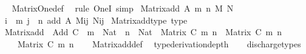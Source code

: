 \begin{isabellebody}
%
\isadelimproof
\ \ %
\endisadelimproof
%
\isatagproof
{}\isamarkupfalse%
\ Matrix{\isacharunderscore}{\kern0pt}One{\isacharunderscore}{\kern0pt}def\ \isamarkupfalse%
\ {\isacharparenleft}{\kern0pt}rule\ OneI{\isacharparenright}{\kern0pt}\ simp%
\endisatagproof
{\isafoldproof}%
%
\isadelimproof
%
\endisadelimproof
%
\isadelimdocument
%
\endisadelimdocument
%
\isatagdocument
%
\isamarkuptrue%
%
\endisatagdocument
{\isafolddocument}%
%
\isadelimdocument
%
\endisadelimdocument
{}\isamarkupfalse%
\ {\isachardoublequoteopen}Matrix{\isacharunderscore}{\kern0pt}add\ A\ m\ n\ M\ N\ {\isasymequiv}\isanewline
\ \ {\isasymlambda}i\ {\isasymin}\ {\isacharbrackleft}{\kern0pt}{}{\isacharcomma}{\kern0pt}{\isasymdots}{\isacharcomma}{\kern0pt}m{\isacharbrackleft}{\kern0pt}{\isachardot}{\kern0pt}\ {\isasymlambda}j\ {\isasymin}\ {\isacharbrackleft}{\kern0pt}{}{\isacharcomma}{\kern0pt}{\isasymdots}{\isacharcomma}{\kern0pt}n{\isacharbrackleft}{\kern0pt}{\isachardot}{\kern0pt}\ add\ A\ {\isacharparenleft}{\kern0pt}M{\isacharbackquote}{\kern0pt}i{\isacharbackquote}{\kern0pt}j{\isacharparenright}{\kern0pt}\ {\isacharparenleft}{\kern0pt}N{\isacharbackquote}{\kern0pt}i{\isacharbackquote}{\kern0pt}j{\isacharparenright}{\kern0pt}{\isachardoublequoteclose}\isanewline
\isanewline
{}\isamarkupfalse%
\ Matrix{\isacharunderscore}{\kern0pt}add{\isacharunderscore}{\kern0pt}type\ {\isacharbrackleft}{\kern0pt}type{\isacharbrackright}{\kern0pt}{\isacharcolon}{\kern0pt}\isanewline
\ \ {\isachardoublequoteopen}Matrix{\isacharunderscore}{\kern0pt}add\ {\isacharcolon}{\kern0pt}\ Add\ C\ {\isasymRightarrow}\ {\isacharparenleft}{\kern0pt}m\ {\isacharcolon}{\kern0pt}\ Nat{\isacharparenright}{\kern0pt}\ {\isasymRightarrow}\ {\isacharparenleft}{\kern0pt}n\ {\isacharcolon}{\kern0pt}\ Nat{\isacharparenright}{\kern0pt}\ {\isasymRightarrow}\ Matrix\ C\ m\ n\ {\isasymRightarrow}\ Matrix\ C\ m\ n\isanewline
\ \ \ \ {\isasymRightarrow}\ Matrix\ C\ m\ n{\isachardoublequoteclose}\isanewline
%
\isadelimproof
\ \ %
\endisadelimproof
%
\isatagproof
{}\isamarkupfalse%
\ Matrix{\isacharunderscore}{\kern0pt}add{\isacharunderscore}{\kern0pt}def\ \isamarkupfalse%
\ {\isacharbrackleft}{\kern0pt}{\isacharbrackleft}{\kern0pt}type{\isacharunderscore}{\kern0pt}derivation{\isacharunderscore}{\kern0pt}depth{\isacharequal}{\kern0pt}{}{\isacharbrackright}{\kern0pt}{\isacharbrackright}{\kern0pt}\isanewline
\ \ \isamarkupfalse%
\ discharge{\isacharunderscore}{\kern0pt}types%

\end{isabellebody}
